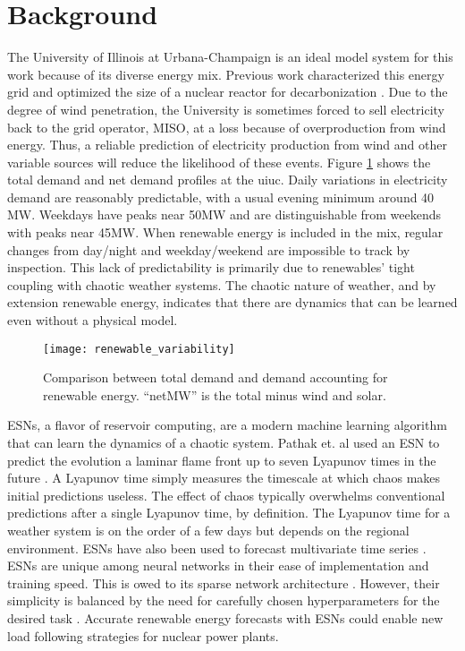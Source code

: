 \section{Background}


The University of Illinois at Urbana-Champaign is an ideal model system for
this work because of its diverse energy mix. Previous work
characterized this energy grid and optimized the size of a nuclear reactor
for decarbonization \cite{dotson_optimal_2020}. Due to the degree of wind
penetration, the University is sometimes
forced to sell electricity back to the grid operator, MISO, at a loss because
of overproduction
from wind energy. Thus, a reliable prediction of electricity production from
wind and other variable sources will reduce the likelihood of these events.
Figure \ref{figure:vre} shows the total demand and net demand profiles at the
\gls{uiuc}.
Daily variations in electricity demand are reasonably predictable, with a
usual evening minimum around 40 MW. Weekdays have peaks near 50MW and are
distinguishable from weekends with peaks near 45MW. When renewable energy is
included in the mix, regular changes from day/night and weekday/weekend are
impossible to track by inspection. This lack of predictability is primarily due
to renewables' tight coupling with chaotic weather systems. The chaotic nature
of weather, and by extension renewable energy, indicates that there are
dynamics that can be learned even without a physical model.
\begin{figure}[h]
  \centering
  \texttt{[image: renewable\_variability]}
  \caption{Comparison between total demand and demand accounting for renewable
   energy. ``netMW'' is the total minus wind and solar.}
  \label{figure:vre}
\end{figure}

\glspl{ESN}, a flavor of reservoir computing, are a modern
machine learning algorithm that can learn the dynamics of a chaotic system.
Pathak et. al used an \gls{ESN} to predict the
evolution a laminar flame front up to seven Lyapunov
times in the future \cite{pathak_model-free_2018, wikner_combining_2020}. A
Lyapunov time simply measures the timescale at which chaos makes initial
predictions useless. The effect of chaos typically overwhelms conventional
predictions after a single Lyapunov time, by definition.
The Lyapunov time for a weather system is on the order of a few days but
depends on the regional environment. \glspl{ESN} have also been used to
forecast multivariate time series \cite{bianchi_reservoir_2020}. \glspl{ESN}
are unique among neural
networks in their ease of implementation and training speed. This is owed to its
sparse network architecture \cite{pathak_model-free_2018,
wikner_combining_2020, vannitsem_predictability_2017}. However,
their simplicity is balanced by the need for carefully chosen hyperparameters
for the desired task \cite{lukosevicius_practical_2012}.
Accurate renewable energy forecasts with \glspl{ESN} could enable new load
following strategies for nuclear power plants.
